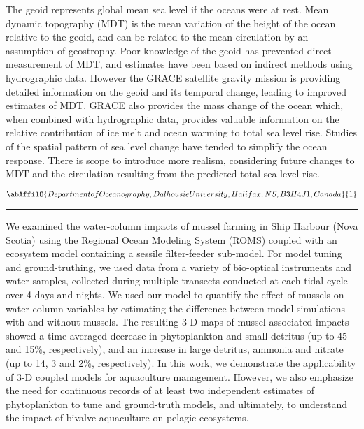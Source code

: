\noindent The geoid represents global mean sea level if the oceans were at rest. Mean dynamic topography (MDT) is the mean variation of the height of the ocean relative to the geoid, and can be related to the mean circulation by an assumption of geostrophy. Poor knowledge of the geoid has prevented direct measurement of MDT, and estimates have been based on indirect methods using hydrographic data. However the GRACE satellite gravity mission is providing detailed information on the geoid and its temporal change, leading to improved estimates of MDT. GRACE also provides the mass change of the ocean which, when combined with hydrographic data, provides valuable information on the relative contribution of ice melt and ocean warming to total sea level rise. Studies of the spatial pattern of sea level change have tended to simplify the ocean response. There is scope to introduce more realism, considering future changes to MDT and the circulation resulting from the predicted total sea level rise.

\begin{center}
   \vspace{2 mm} \begin{center}
    \vspace{2 mm}\begin{center}
  
  $\abAffilO{Department of Oceanography, Dalhousie University, Halifax, NS, B3H 4J1, Canada}{1}$

  \end{center}
  \vspace{2 mm}
  \end{center}\end{center}
  \begin{center}\rule{0.70\linewidth}{0.5 pt}\end{center}

\noindent We examined the water-column impacts of mussel farming in Ship Harbour (Nova Scotia) using the Regional Ocean Modeling System (ROMS) coupled with an ecosystem model containing a sessile filter-feeder sub-model. For model tuning and ground-truthing, we used data from a variety of bio-optical instruments and water samples, collected during multiple transects conducted at each tidal cycle over 4 days and nights. We used our model to quantify the effect of mussels on water-column variables by estimating the difference between model simulations with and without mussels. The resulting 3-D maps of mussel-associated impacts showed a time-averaged decrease in phytoplankton and small detritus (up to 45 and 15\%, respectively), and an increase in large detritus, ammonia and nitrate (up to 14, 3 and 2\%, respectively). In this work, we demonstrate the applicability of 3-D coupled models for aquaculture management. However, we also emphasize the need for continuous records of at least two independent estimates of phytoplankton to tune and ground-truth models, and ultimately, to understand the impact of bivalve aquaculture on pelagic ecosystems.

